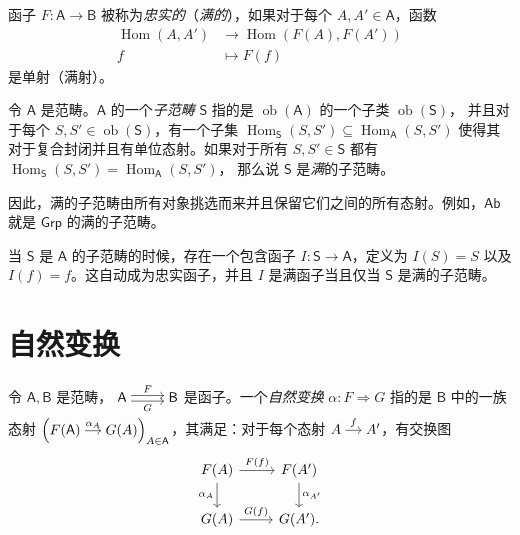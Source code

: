 \documentclass[fontset=none]{Notes}
\newenvironment{arr}[1][]{%
  $\begin{tikzcd}[cramped,#1]
}{\end{tikzcd}$}
\DeclareMathOperator\Hom{Hom}
\DeclareMathOperator\ob{ob}
\newcommand{\cat}[1]{\mathsf{#1}}
\begin{document}
\begin{definition}
  函子 $F:\cat A\to\cat B$ 被称为\emph{忠实的}（\emph{满的}），如果对于每个 $A,A'\in\cat A$，函数
  \begin{align*}
    \Hom(A,A')&\to \Hom(F(A),F(A'))\\
    f&\mapsto F(f)
  \end{align*}
  是单射（满射）。
\end{definition}

\begin{definition}
  令 $\cat A$ 是范畴。$\cat A$ 的一个\emph{子范畴} $\cat S$ 指的是 $\ob(\cat A)$ 的一个子类 $\ob(\cat S)$，
  并且对于每个 $S,S'\in\ob(\cat S)$，有一个子集 $\Hom_{\cat S}(S,S')\subseteq \Hom_{\cat A}(S,S')$
  使得其对于复合封闭并且有单位态射。如果对于所有 $S,S'\in\cat S$ 都有 $\Hom_{\cat S}(S,S')=\Hom_{\cat A}(S,S')$，
  那么说 $\cat S$ 是\emph{满}的子范畴。
\end{definition}

因此，满的子范畴由所有对象挑选而来并且保留它们之间的所有态射。例如，$\cat{Ab}$ 就是 $\cat{Grp}$ 的满的子范畴。

当 $\cat S$ 是 $\cat A$ 的子范畴的时候，存在一个包含函子 $I:\cat S\to\cat A$，定义为 $I(S)=S$
以及 $I(f)=f$。这自动成为忠实函子，并且 $I$ 是满函子当且仅当 $\cat S$ 是满的子范畴。

\section{自然变换}

\begin{definition}
  令 $\cat A,\cat B$ 是范畴，
  \begin{arr}
    \cat A\arrow[r,yshift=2pt,"F"]\arrow[r,yshift=-2pt,"G"'] & \cat B
  \end{arr}
  是函子。一个\emph{自然变换} $\alpha:F\Rightarrow  G$ 指的是 $\cat B$ 中的一族态射
  $\left(
    \begin{tikzcd}[sep=small,cramped]
      F(\cat A)\arrow[r,"\alpha_A"] & G(A)
    \end{tikzcd}
  \right)_{A\in\cat A}$，其满足：对于每个态射 
  \begin{arr}[sep=small]
    A\arrow[r,"f"] & A'
  \end{arr}，有交换图
  \[
    \begin{tikzcd}
      F(A)\arrow[r,"F(f)"]\arrow[d,"\alpha_A"'] & F(A')\arrow[d,"\alpha_{A'}"] \\
      G(A)\arrow[r,"G(f)"] & G(A').
    \end{tikzcd}
  \]
\end{definition}

\begin{example}
  
\end{example}
\end{document}
